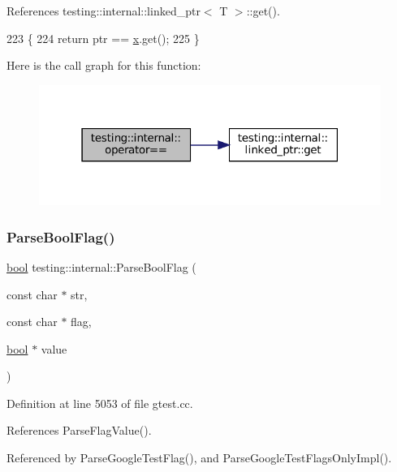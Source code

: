 References testing\+::internal\+::linked\+\_\+ptr$<$ T $>$\+::get().


\begin{DoxyCode}
223                                                 \{
224   \textcolor{keywordflow}{return} ptr == \hyperlink{namespaceinteractive__marker_acda52804aef30b460a72fb21ee01d69d}{x}.get();
225 \}
\end{DoxyCode}
Here is the call graph for this function\+:
\nopagebreak
\begin{figure}[H]
\begin{center}
\leavevmode
\includegraphics[width=316pt]{namespacetesting_1_1internal_ad1cb54a206a209ddace17a05359d38ae_cgraph}
\end{center}
\end{figure}
\mbox{\label{namespacetesting_1_1internal_ada3b98e7cfe93f4ba2053c470d9e3e51}} 
\subsubsection{\texorpdfstring{Parse\+Bool\+Flag()}{ParseBoolFlag()}}
{\footnotesize\ttfamily \hyperlink{classbool}{bool} testing\+::internal\+::\+Parse\+Bool\+Flag (\begin{DoxyParamCaption}\item[{const char $\ast$}]{str,  }\item[{const char $\ast$}]{flag,  }\item[{\hyperlink{classbool}{bool} $\ast$}]{value }\end{DoxyParamCaption})}



Definition at line 5053 of file gtest.\+cc.



References Parse\+Flag\+Value().



Referenced by Parse\+Google\+Test\+Flag(), and Parse\+Google\+Test\+Flags\+Only\+Impl().


